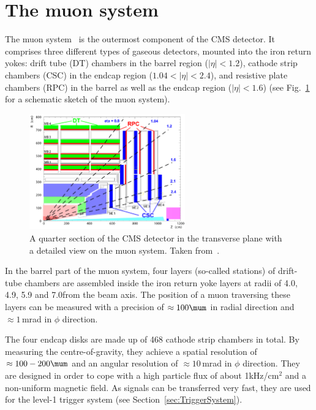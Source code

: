 \section{The muon system}
\label{sec:MuonSystem}
The muon system~\cite{bib:CMS:TDR_2006,bib:CMS:TDR_MuonSystem} is the outermost component of the CMS detector.
It comprises three different types of gaseous detectors, mounted into the iron return yokes: drift tube (DT) chambers in the barrel region ($|\eta|<1.2$), cathode strip chambers (CSC) in the endcap region ($1.04<|\eta|<2.4$), and resistive plate chambers (RPC) in the barrel as well as the endcap region ($|\eta|<1.6$) (see Fig.~\ref{fig:MuonSystem} for a schematic sketch of the muon system).
\begin{figure}[!b]
  \centering
      \includegraphics[width=0.60\textwidth]{figures/experiment/CMS/Figures_Experimental_Apparatus_MuonDetector.png}
  \caption{A quarter section of the CMS detector in the transverse plane with a detailed view on the muon system. Taken from~\cite{bib:CMS:TDR_2006}.}  
  \label{fig:MuonSystem}
\end{figure}
In the barrel part of the muon system, four layers (so-called stations) of drift-tube chambers are assembled inside the iron return yoke layers at radii of 4.0, 4.9, 5.9 and 7.0\m from the beam axis.
The position of a muon traversing these layers can be measured with a precision of $\approx 100\mum$ in radial direction and $\approx 1\,$mrad in $\phi$ direction. 

The four endcap disks are made up of 468 cathode strip chambers in total.
By measuring the centre-of-gravity, they achieve a spatial resolution of $\approx 100-200\mum$ and an angular resolution of $\approx 10\,$mrad in $\phi$ direction.
They are designed in order to cope with a high particle flux of about 1kHz/cm$^2$ and a non-uniform magnetic field.
As signals can be transferred very fast, they are used for the level-1 trigger system (see Section~\ref{sec:TriggerSystem}).

